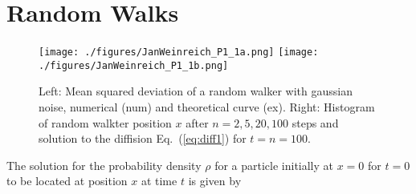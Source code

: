 \documentclass[12pt]{article}
\date{}
\begin{document}


\section{Random Walks}
\begin{figure}[H]
  \centering
    \texttt{[image: ./figures/JanWeinreich\_P1\_1a.png]}
    \texttt{[image: ./figures/JanWeinreich\_P1\_1b.png]}
    \caption{Left: Mean squared deviation of a random walker with gaussian noise, 
             numerical (num) and theoretical curve (ex).  
             Right: Histogram of random walkter position $x$ after $n=2, 5, 20, 100$ steps and solution to the diffision 
             Eq.~(\ref{eq:diff1}) for $t= n=100$.}
    \label{fig:abb1}
  \end{figure}


The solution for the probability density $\rho$ for a particle
initially at $x=0$ for $t=0$ to be located at position $x$ at time $t$ is given by
\end{document}
